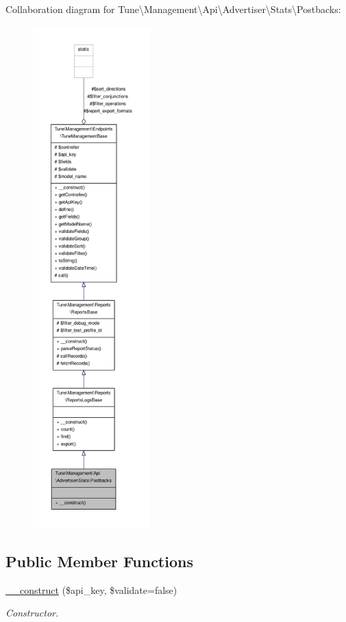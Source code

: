 Collaboration diagram for Tune\textbackslash{}Management\textbackslash{}Api\textbackslash{}Advertiser\textbackslash{}Stats\textbackslash{}Postbacks\-:
\nopagebreak
\begin{figure}[H]
\begin{center}
\leavevmode
\includegraphics[height=550pt]{classTune_1_1Management_1_1Api_1_1Advertiser_1_1Stats_1_1Postbacks__coll__graph}
\end{center}
\end{figure}
\subsection*{Public Member Functions}
\begin{DoxyCompactItemize}
\item 
\hyperlink{classTune_1_1Management_1_1Api_1_1Advertiser_1_1Stats_1_1Postbacks_ac41b19c897e54ab7b663b53ad9f88b9a}{\-\_\-\-\_\-construct} (\$api\-\_\-key, \$validate=false)
\begin{DoxyCompactList}\small\item\em Constructor. \end{DoxyCompactList}\end{DoxyCompactItemize}
